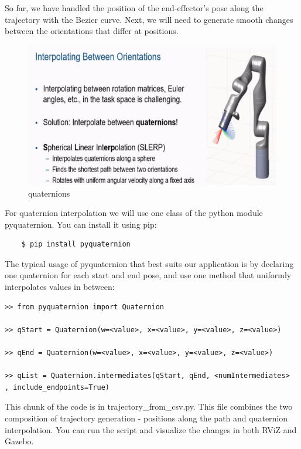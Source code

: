 \documentclass[12pt]{article}
\begin{document}
So far, we have handled the position of the end-effector’s pose along the trajectory with the Bezier curve. Next, we will need to generate
smooth changes between the orientations that differ at positions.

\begin{figure}[H]
    \vspace{-10pt}
    \centering\includegraphics[width=12cm]{images/lab72.png}\vspace{-10pt}
    \caption{quaternions}\label{fig:curves}
    \end{figure}


For quaternion interpolation we will use one class of the python module pyquaternion. You can install it using pip:
\begin{verbatim}
    $ pip install pyquaternion
    \end{verbatim}


The typical usage of pyquaternion that best suits our application is by declaring one quaternion for each start and end pose, and use one method that uniformly interpolates values in between:
    \begin{verbatim}
>> from pyquaternion import Quaternion

>> qStart = Quaternion(w=<value>, x=<value>, y=<value>, z=<value>)

>> qEnd = Quaternion(w=<value>, x=<value>, y=<value>, z=<value>)

>> qList = Quaternion.intermediates(qStart, qEnd, <numIntermediates>
, include_endpoints=True)

\end{verbatim}

This chunk of the code is in trajectory\_from\_csv.py. This file combines the two composition of trajectory generation - positions along the path and quaternion interpolation. You can run the script and visualize the changes in both RViZ and Gazebo.
\end{document}
